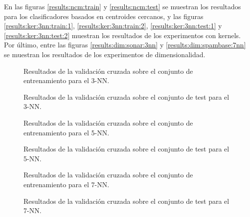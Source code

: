 En las figuras \ref{results:ncm:train} y \ref{results:ncm:test} se muestran los resultados para los clasificadores basados en centroides cercanos, y las figuras \ref{results:ker:3nn:train:1}, \ref{results:ker:3nn:train:2}, \ref{results:ker:3nn:test:1} y \ref{results:ker:3nn:test:2} muestran los resultados de los experimentos con kernels. Por último, entre las figuras \ref{results:dim:sonar:3nn} y \ref{results:dim:spambase:7nn} se muestran los resultados de los experimentos de dimensionalidad.

\begin{figure}[h]
\resizebox{\textwidth}{!}{%
    
}
\caption{Resultados de la validación cruzada sobre el conjunto de entrenamiento para el 3-NN.} \label{results:normal:3nn:train}
\end{figure}

\begin{figure}[h]
\resizebox{\textwidth}{!}{%
    
}
\caption{Resultados de la validación cruzada sobre el conjunto de test para el 3-NN.} \label{results:normal:3nn:test}
\end{figure}

\begin{figure}[h]
\resizebox{\textwidth}{!}{%
    
}
\caption{Resultados de la validación cruzada sobre el conjunto de entrenamiento para el 5-NN.} \label{results:normal:5nn:train}
\end{figure}

\begin{figure}[h]
\resizebox{\textwidth}{!}{%
    
}
\caption{Resultados de la validación cruzada sobre el conjunto de test para el 5-NN.} \label{results:normal:5nn:test}
\end{figure}

\begin{figure}[h]
\resizebox{\textwidth}{!}{%
    
}
\caption{Resultados de la validación cruzada sobre el conjunto de entrenamiento para el 7-NN.} \label{results:normal:7nn:train}
\end{figure}

\begin{figure}[h]
\resizebox{\textwidth}{!}{%
    
}
\caption{Resultados de la validación cruzada sobre el conjunto de test para el 7-NN.} \label{results:normal:7nn:test}
\end{figure}

